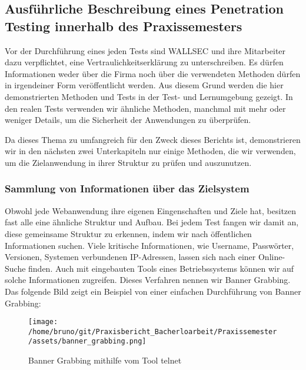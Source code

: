    



\subsection{Ausführliche Beschreibung eines Penetration Testing innerhalb des Praxissemesters}

Vor der Durchführung eines jeden Tests sind WALLSEC und ihre Mitarbeiter dazu verpflichtet, eine Vertraulichkeitserklärung zu unterschreiben. Es dürfen Informationen weder über die Firma noch über die verwendeten Methoden dürfen in irgendeiner Form veröffentlicht werden. Aus diesem Grund werden die hier demonstrierten Methoden und Tests in der Test- und Lernumgebung  gezeigt. In den realen Tests verwenden wir ähnliche Methoden, manchmal mit mehr oder weniger Details, um die Sicherheit der Anwendungen zu überprüfen. 

Da dieses Thema zu umfangreich für den Zweck dieses Berichts ist, demonstrieren wir in den nächsten zwei Unterkapiteln nur einige Methoden, die wir verwenden, um die Zielanwendung in ihrer Struktur zu prüfen und auszunutzen.

\subsubsection{Sammlung von Informationen über das Zielsystem}

Obwohl jede Webanwendung ihre eigenen Eingenschaften und Ziele hat, besitzen fast alle eine ähnliche Struktur und Aufbau. Bei jedem Test fangen wir damit an, diese gemeinsame Struktur zu erkennen, indem wir nach öffentlichen Informationen suchen. Viele kritische Informationen, wie Username, Passwörter, Versionen, Systemen verbundenen IP-Adressen, lassen sich nach einer Online-Suche finden. Auch mit eingebauten Tools eines Betriebssystems können wir auf solche Informationen zugreifen. Dieses Verfahren nennen wir Banner Grabbing. Das folgende Bild zeigt ein Beispiel von einer einfachen Durchführung von Banner Grabbing:

\begin{figure}[H]
    \centering
    \texttt{[image: /home/bruno/git/Praxisbericht\_Bacherloarbeit/Praxissemester/assets/banner\_grabbing.png]}
    \caption{Banner Grabbing mithilfe vom Tool telnet}
    \centering
\end{figure}


